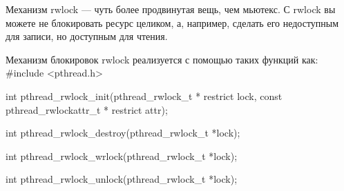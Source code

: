 Механизм rwlock --- чуть более продвинутая вещь, чем мьютекс. С rwlock вы можете не блокировать ресурс целиком, а, например, сделать его недоступным для записи, но доступным для чтения. 

\begin{CCode}{Механизм блокировок rwlock реализуется с помощью таких функций как:}
	#include <pthread.h>

    int pthread_rwlock_init(pthread_rwlock_t * restrict lock,
        const pthread_rwlockattr_t * restrict attr);

    int pthread_rwlock_destroy(pthread_rwlock_t *lock);

	int pthread_rwlock_wrlock(pthread_rwlock_t *lock);

    int pthread_rwlock_unlock(pthread_rwlock_t *lock);
\end{CCode}
